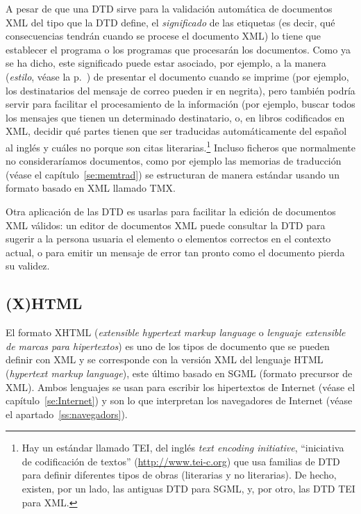 A pesar de que una DTD sirve para la validación automática de documentos XML del tipo que la DTD define, el \emph{significado} de las etiquetas (es decir, qué consecuencias tendrán cuando se procese el documento XML) lo tiene que establecer el programa o los programas que procesarán los documentos. Como ya se ha dicho, este significado puede estar asociado, por ejemplo, a la manera (\emph{estilo}, véase la p.~\pageref{pg:estil}) de presentar el documento cuando se imprime (por ejemplo, los destinatarios del mensaje de correo pueden ir en negrita), pero también podría servir para facilitar el procesamiento de la información (por ejemplo, buscar todos los mensajes que tienen un determinado destinatario, o, en libros codificados en XML, decidir qué partes tienen que ser traducidas automáticamente del español al inglés y cuáles no porque son citas literarias.\footnote{Hay un estándar llamado TEI, del inglés \emph{text encoding initiative}, ``iniciativa de codificación de textos'' (\url{http://www.tei-c.org}) que usa familias de DTD para definir diferentes tipos de obras (literarias y no literarias). De hecho, existen, por un lado, las antiguas DTD para SGML, y, por otro, las DTD TEI para XML.} Incluso ficheros que normalmente no consideraríamos documentos, como por ejemplo las memorias de traducción (véase el capítulo~\ref{se:memtrad}) se estructuran de manera estándar usando un formato basado en XML llamado TMX. 

Otra aplicación de las DTD es usarlas para facilitar la edición de documentos XML válidos: un editor de documentos XML puede consultar la DTD para sugerir a la persona usuaria el elemento o elementos correctos en el contexto actual, o para emitir un mensaje de error tan pronto como el documento pierda su validez. 

\subsection{(X)HTML} \label{s3:HTML} 

El formato XHTML (\emph{extensible hypertext markup language} o \emph{lenguaje extensible de marcas para hipertextos}) es uno de los tipos de documento que se pueden definir con XML y se corresponde con la versión XML del lenguaje HTML (\emph{hypertext markup language}), este último basado en SGML (formato precursor de XML). Ambos lenguajes se usan para escribir los hipertextos de Internet (véase el capítulo~\ref{se:Internet}) y son lo que interpretan los navegadores de Internet (véase el apartado~\ref{ss:navegadors}). 

